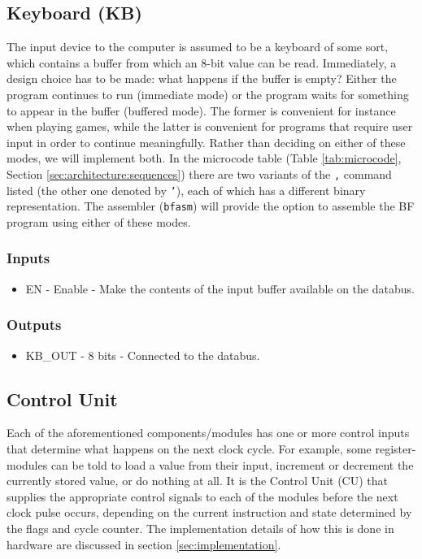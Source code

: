 \subsection{Keyboard (KB)} \label{sec:architecture:kb}
The input device to the computer is assumed to be a keyboard of some sort, which contains a buffer from which an 8-bit value can be read. Immediately, a design choice has to be made: what happens if the buffer is empty? Either the program continues to run (immediate mode) or the program waits for something to appear in the buffer (buffered mode). The former is convenient for instance when playing games, while the latter is convenient for programs that require user input in order to continue meaningfully. Rather than deciding on either of these modes, we will implement both. In the microcode table (Table \ref{tab:microcode}, Section \ref{sec:architecture:sequences}) there are two variants of the \texttt{,} command listed (the other one denoted by \texttt{'}), each of which has a different binary representation. The assembler (\texttt{bfasm}) will provide the option to assemble the BF program using either of these modes.

\subsubsection*{Inputs}
\begin{itemize}
\itemsep0em 
\item EN - Enable - Make the contents of the input buffer available on the databus.
\end{itemize}

\subsubsection*{Outputs}
\begin{itemize}
\itemsep0em 
\item KB\_OUT - 8 bits - Connected to the databus.
\end{itemize}

\subsection{Control Unit} \label{sec:architecture:cu}
Each of the aforementioned components/modules has one or more control inputs that determine what happens on the next clock cycle. For example, some register-modules can be told to load a value from their input, increment or decrement the currently stored value, or do nothing at all. It is the Control Unit (CU) that supplies the appropriate control signals to each of the modules before the next clock pulse occurs, depending on the current instruction and state determined by the flags and cycle counter. The implementation details of how this is done in hardware are discussed in section \ref{sec:implementation}.

